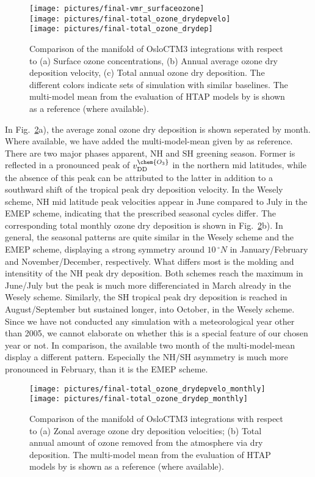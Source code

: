 \documentclass[gmd, manuscript]{copernicus}
\begin{document}
\begin{figure}[t]
  \texttt{[image: pictures/final-vmr\_surfaceozone]}\\
  \texttt{[image: pictures/final-total\_ozone\_drydepvelo]}\\
  \texttt{[image: pictures/final-total\_ozone\_drydep]}
  \caption{Comparison of the manifold of OsloCTM3 integrations with respect to (a) Surface ozone concentrations, (b) Annual average ozone dry deposition velocity, (c) Total annual ozone dry deposition. The different colors indicate sets of simulation with similar baselines. The multi-model mean from the evaluation of HTAP models by \citet{ACP:Hardacre2015} is shown as a reference (where available).}
  \label{fig:mmm_drydep}
\end{figure}
%
In Fig.~\ref{fig:mmm_drydep_season}a), the average zonal ozone dry deposition is shown seperated by month. Where available, we have added the multi-model-mean given by \citet{ACP:Hardacre2015} as reference. There are two major phases apparent, NH and SH greening season. Former is reflected in a pronounced peak of $v_\text{DD}^\chem{O_3}$ in the northern mid latitudes, while the absence of this peak can be attributed to the latter in addition to a southward shift of the tropical peak dry deposition velocity. In the Wesely scheme, NH mid latitude peak velocities appear in June compared to July in the EMEP scheme, indicating that the prescribed seasonal cycles differ. The corresponding total monthly ozone dry deposition is shown in Fig.~\ref{fig:mmm_drydep_season}b). In general, the seasonal patterns are quite similar in the Wesely scheme and the EMEP scheme, displaying a strong symmetry around $10\,\unit{^\circ N}$ in January/February and November/December, respectively. What differs most is the molding and intensitity of the NH peak dry deposition. Both schemes reach the maximum in June/July but the peak is much more differenciated in March already in the Wesely scheme. Similarly, the SH tropical peak dry deposition is reached in August/September but sustained longer, into October, in the Wesely scheme. Since we have not conducted any simulation with a meteorological year other than 2005, we cannot elaborate on whether this is a special feature of our chosen year or not. In comparison, the available two month of the multi-model-mean display a different pattern. Especially the NH/SH asymmetry is much more pronounced in February, than it is the EMEP scheme.
%
\begin{figure}[t]
  \texttt{[image: pictures/final-total\_ozone\_drydepvelo\_monthly]}\\
  \texttt{[image: pictures/final-total\_ozone\_drydep\_monthly]}
  \caption{Comparison of the manifold of OsloCTM3 integrations with respect to (a) Zonal average ozone dry deposition velocities; (b) Total annual amount of ozone removed from the atmosphere via dry deposition. The multi-model mean from the evaluation of HTAP models by \citet{ACP:Hardacre2015} is shown as a reference (where available).}
  \label{fig:mmm_drydep_season}
\end{figure}
\end{document}
